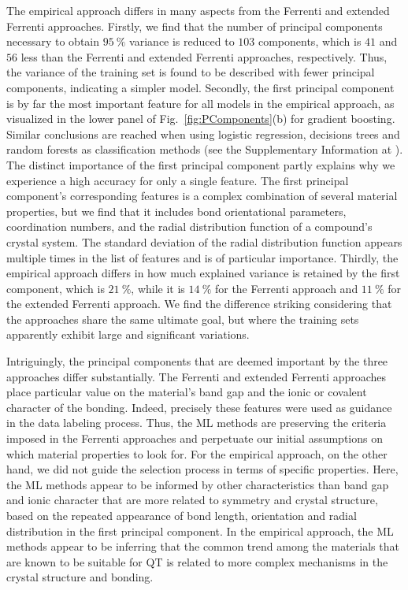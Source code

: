 \documentclass[superscriptaddress,unsortedaddress,
 amsmath,amssymb,
 aps,
]{revtex4-2}
\begin{document}
The empirical approach differs in many aspects from the Ferrenti and extended Ferrenti approaches. 
Firstly, we find that the number of principal components necessary to obtain $95 \ \%$ variance is reduced to $103$ components, which is $41$ and $56$ less than the Ferrenti and extended Ferrenti approaches, respectively. Thus, the variance of the training set is found to be described with fewer principal components, indicating a simpler model. Secondly, the first principal component is by far the most important feature for all models in the empirical approach, as visualized in the lower panel of Fig.~\ref{fig:PComponents}(b) for gradient boosting. Similar conclusions are reached when using logistic regression, decisions trees and random forests as classification methods (see the Supplementary Information at \cite{supplementary}). 
The distinct importance of the first principal component partly explains why we experience a high accuracy for only a single feature. The first principal component's corresponding features is a complex combination of several material properties, but we find that it includes bond orientational parameters, coordination numbers, and the radial distribution function of a compound's crystal system. 
The standard deviation of the radial distribution function appears multiple times in the list of features and is of particular importance. 
Thirdly, the empirical approach differs in how much explained variance is retained by the first component, which is $21 \ \%$, while it is $14 \ \%$ for the Ferrenti approach and $11 \ \%$ for the extended Ferrenti approach. We find the difference striking considering that the approaches share the same ultimate goal, but where the training sets apparently exhibit large and significant variations. 

Intriguingly, the principal components that are deemed important by the three approaches differ substantially. The Ferrenti and extended Ferrenti approaches place particular value on the material's band gap and the ionic or covalent character of the bonding. Indeed, precisely these features were used as guidance in the data labeling process. Thus, the ML methods are preserving the criteria imposed in the Ferrenti approaches and perpetuate our initial assumptions on which material properties to look for. For the empirical approach, on the other hand, we did not guide the selection process in terms of specific properties. Here, the ML methods appear to be informed by other  characteristics than band gap and ionic character that are more related to symmetry and crystal structure, based on the repeated appearance of bond length, orientation and radial distribution in the first principal component. In the empirical approach, the ML methods appear to be inferring that the common trend among the materials that are known to be suitable for QT is related to more complex mechanisms in the crystal structure and bonding. 
\end{document}

